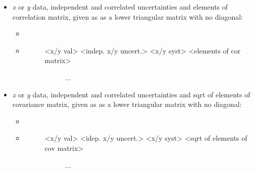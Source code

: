 \documentclass[a4paper,10pt,english]{sphinxmanual}
\begin{document}
\begin{fulllineitems}
\begin{itemize}
\begin{itemize}
\begin{description}
\begin{description}
\end{description}

\end{description}

\end{itemize}

\item {} 
\emph{x} or \emph{y} data, independent and correlated uncertainties and elements of
correlation matrix, given as as a lower triangular matrix with no diagonal:
\begin{itemize}
\item {} 

\item {} \begin{description}
\item[{}] \leavevmode\begin{description}
\item[{\textless{}x/y val\textgreater{}  \textless{}indep. x/y uncert.\textgreater{}  \textless{}x/y syst\textgreater{}  \textless{}elements of cor matrix\textgreater{}}] \leavevmode
...

\end{description}

\end{description}

\end{itemize}

\item {} 
\emph{x} or \emph{y} data, independent and correlated uncertainties and sqrt of
elements of covariance matrix, given as as a lower triangular matrix
with no diagonal:
\begin{itemize}
\item {} 

\item {} \begin{description}
\item[{}] \leavevmode\begin{description}
\item[{\textless{}x/y val\textgreater{}  \textless{}idep. x/y uncert.\textgreater{}  \textless{}x/y syst\textgreater{}  \textless{}sqrt of elements of cov matrix\textgreater{}}] \leavevmode
...

\end{description}

\end{description}

\end{itemize}


\end{itemize}
\end{fulllineitems}
\end{document}
